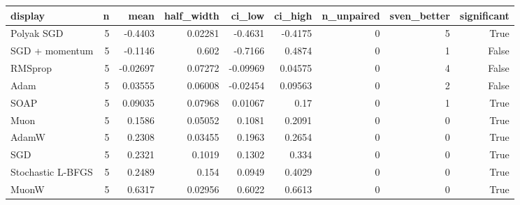 \begin{tabular}{lrrrrrrrr}
\toprule
display & n & mean & half\_width & ci\_low & ci\_high & n\_unpaired & sven\_better & significant \\
\midrule
Polyak SGD & 5 & -0.4403 & 0.02281 & -0.4631 & -0.4175 & 0 & 5 & True \\
SGD + momentum & 5 & -0.1146 & 0.602 & -0.7166 & 0.4874 & 0 & 1 & False \\
RMSprop & 5 & -0.02697 & 0.07272 & -0.09969 & 0.04575 & 0 & 4 & False \\
Adam & 5 & 0.03555 & 0.06008 & -0.02454 & 0.09563 & 0 & 2 & False \\
SOAP & 5 & 0.09035 & 0.07968 & 0.01067 & 0.17 & 0 & 1 & True \\
Muon & 5 & 0.1586 & 0.05052 & 0.1081 & 0.2091 & 0 & 0 & True \\
AdamW & 5 & 0.2308 & 0.03455 & 0.1963 & 0.2654 & 0 & 0 & True \\
SGD & 5 & 0.2321 & 0.1019 & 0.1302 & 0.334 & 0 & 0 & True \\
Stochastic L-BFGS & 5 & 0.2489 & 0.154 & 0.0949 & 0.4029 & 0 & 0 & True \\
MuonW & 5 & 0.6317 & 0.02956 & 0.6022 & 0.6613 & 0 & 0 & True \\
\bottomrule
\end{tabular}
